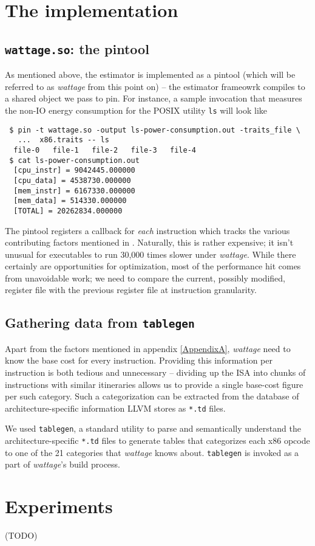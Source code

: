 \section{The implementation}

\subsection{\texttt{wattage.so}: the pintool}

As mentioned above, the estimator is implemented as a pintool (which
will be referred to as \textit{wattage} from this point on) -- the
estimator frameowrk compiles to a shared object we pass to pin.  For
instance, a sample invocation that measures the non-IO energy
consumption for the POSIX utility \texttt{ls} will look like

\begin{verbatim}
 $ pin -t wattage.so -output ls-power-consumption.out -traits_file \
   ...  x86.traits -- ls
  file-0   file-1   file-2   file-3   file-4
 $ cat ls-power-consumption.out
  [cpu_instr] = 9042445.000000
  [cpu_data] = 4538730.000000
  [mem_instr] = 6167330.000000
  [mem_data] = 514330.000000
  [TOTAL] = 20262834.000000
\end{verbatim}

The pintool registers a callback for \textit{each} instruction which
tracks the various contributing factors mentioned in \cite{steinke}.
Naturally, this is rather expensive; it isn't unusual for executables
to run 30,000 times slower under \textit{wattage}.  While there
certainly are opportunities for optimization, most of the performance
hit comes from unavoidable work; we need to compare the current,
possibly modified, register file with the previous register file at
instruction granularity.

\subsection{Gathering data from \texttt{tablegen}}

Apart from the factors mentioned in appendix \ref{AppendixA},
\textit{wattage} need to know the base cost for every instruction.
Providing this information per instruction is both tedious and
unnecessary -- dividing up the ISA into chunks of instructions with
similar itineraries allows us to provide a single base-cost figure per
such category.  Such a categorization can be extracted from the
database of architecture-specific information LLVM stores as
\texttt{*.td} files.

We used \texttt{tablegen}, a standard utility to parse and
semantically understand the architecture-specific \texttt{*.td} files
to generate tables that categorizes each x86 opcode to one of the 21
categories that \textit{wattage} knows about.  \texttt{tablegen} is
invoked as a part of \textit{wattage}'s build process.

\section{Experiments}

(TODO)
